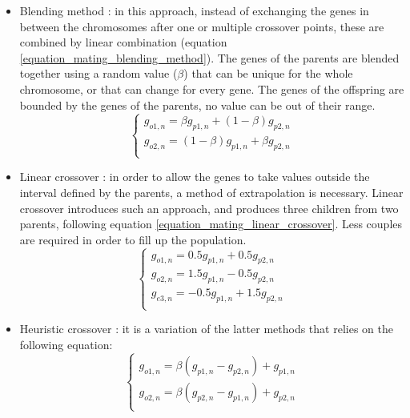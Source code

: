 \documentclass{ametsoc}
\begin{document}
\begin{itemize}
	\item Blending method \citep{Radcliffe1991a}: in this approach, instead of exchanging the genes in between the chromosomes after one or multiple crossover points, these are combined by linear combination (equation \ref{equation_mating_blending_method}). The genes of the parents are blended together using a random value ($\beta$) that can be unique for the whole chromosome, or that can change for every gene. The genes of the offspring are bounded by the genes of the parents, no value can be out of their range.
	\begin{equation}
	\left\lbrace \begin{array}{l} 
	g_{o1,n} = \beta g_{p1,n} + (1-\beta)g_{p2,n} \\ 
	g_{o2,n} = (1-\beta) g_{p1,n} + \beta g_{p2,n} \\
	\end{array} \right.
	\label{equation_mating_blending_method}
	\end{equation}
	
	\item Linear crossover \citep{Wright1991a}: in order to allow the genes to take values outside the interval defined by the parents, a method of extrapolation is necessary. Linear crossover introduces such an approach, and produces three children from two parents, following equation \ref{equation_mating_linear_crossover}. Less couples are required in order to fill up the population.
	\begin{equation}
	\left\lbrace \begin{array}{l} 
	g_{o1,n} = 0.5 g_{p1,n} + 0.5 g_{p2,n} \\ 
	g_{o2,n} = 1.5 g_{p1,n} - 0.5 g_{p2,n} \\ 
	g_{e3,n} = - 0.5 g_{p1,n} + 1.5 g_{p2,n} \\ 
	\end{array} \right.
	\label{equation_mating_linear_crossover}
	\end{equation}
	
	\item Heuristic crossover \citep{Michalewicz1996}: it is a variation of the latter methods that relies on the following equation:
	\begin{equation}
	\left\lbrace \begin{array}{l} 
	g_{o1,n} = \beta (g_{p1,n} - g_{p2,n}) + g_{p1,n} \\
	g_{o2,n} = \beta (g_{p2,n} - g_{p1,n}) + g_{p2,n} \\
	\end{array} \right.
	\label{equation_mating_heuristic_crossover}
	\end{equation}
	

\end{itemize}
\end{document}
